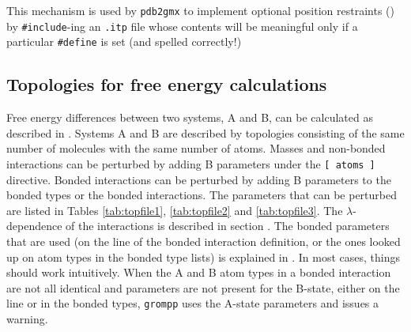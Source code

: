 This mechanism is used by {\tt pdb2gmx} to implement optional position
restraints () by {\tt \#include}-ing an {\tt .itp} file whose contents
will be meaningful only if a particular {\tt \#define} is set (and spelled
correctly!)

\subsection{Topologies for free energy calculations}
Free energy differences between two systems, A and B, can be calculated as
described in .
Systems A and B are described by topologies
consisting of the same number of molecules with the same number of
atoms. Masses and non-bonded interactions can be perturbed by adding B
parameters under the {\tt [~atoms~]} directive. Bonded interactions can be 
perturbed by adding B parameters to the bonded types or the bonded
interactions. The parameters that can be perturbed are listed in  
Tables \ref{tab:topfile1}, \ref{tab:topfile2} and \ref{tab:topfile3}.
The $\lambda$-dependence of the interactions is described
in section .
The bonded parameters that are used (on the line of the bonded
interaction definition, or the ones looked up on atom types
in the bonded type lists) is explained in .
In most cases, things should work intuitively.
When the A and B atom types in a bonded interaction
are not all identical and parameters are not present for the B-state,
either on the line or in the bonded types,
{\tt grompp} uses the A-state parameters and issues a warning.


